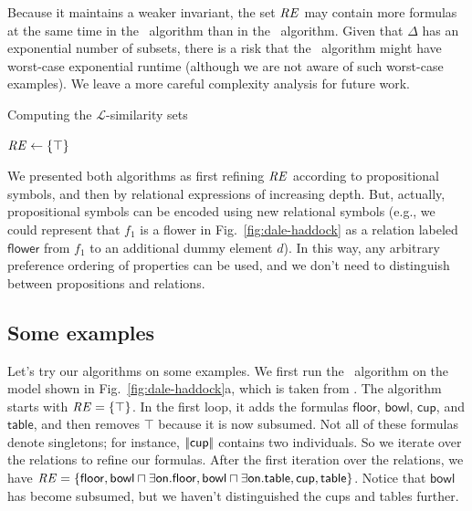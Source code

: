 Because it maintains a weaker invariant, the set $\mathit{RE}$ may contain
more formulas at the same time in the \el\ algorithm than in the \alc\
algorithm.  Given that $\Delta$ has an exponential number of subsets,
there is a risk that the \el\ algorithm might have worst-case
exponential runtime (although we are not aware of such worst-case
examples).  We leave a more careful complexity analysis for future work.

\begin{algorithm}[t]
\dontprintsemicolon
\caption{Computing the $\mathcal{L}$-similarity sets}
\label{algo:bisim-l}

$\mathit{RE} \leftarrow \{\top\}$


\end{algorithm}


We presented both algorithms as first refining $\mathit{RE}$ according to
propositional symbols, and then by relational expressions of
increasing depth. But, actually, propositional symbols can be encoded
using new relational symbols (e.g., we could represent that $f_1$ is a
flower in Fig.~\ref{fig:dale-haddock} as a relation labeled
$\mathsf{flower}$ from $f_1$ to an additional dummy element $d$).  In
this way, any arbitrary preference ordering of properties can be used,
and we don't need to distinguish between propositions and relations.


\subsection{Some examples}\label{sec:examples}

Let's try our algorithms on some examples.  We first run the \el\
algorithm on the model shown in Fig.~\ref{fig:dale-haddock}a, which is
taken from \newcite{dale91:_gener_refer_expres_invol_relat}.  The
algorithm starts with $\mathit{RE} = \{\top\}$.  In the first loop, it adds
the formulas $\mathsf{floor}$, $\mathsf{bowl}$, $\mathsf{cup}$, and
$\mathsf{table}$, and then removes $\top$ because it is now subsumed.
Not all of these formulas denote singletons; for instance,
$|\!|\mathsf{cup}|\!|$ contains two individuals.  So we iterate over
the relations to refine our formulas.  After the first iteration over
the relations, we have $\mathit{RE} = \{ \mathsf{floor}, \mathsf{bowl} \sqcap
\exists \mathsf{on}.\mathsf{floor}, \mathsf{bowl} \sqcap \exists
\mathsf{on}.\mathsf{table}, \mathsf{cup}, \mathsf{table} \}$. Notice
that $\mathsf{bowl}$ has become subsumed, but we haven't distinguished
the cups and tables further.



